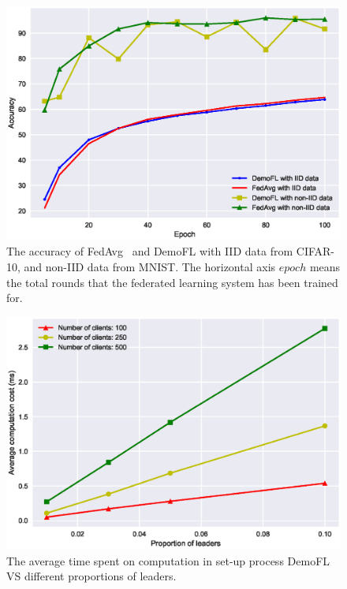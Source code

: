 \begin{figure}[!ht]
    \centering
    \includegraphics[width=\columnwidth]{img/acc.eps}
    \caption{The accuracy of FedAvg~\cite{mcmahan2016communicationefficient} and DemoFL with IID data from CIFAR-10, and non-IID data from MNIST. The horizontal axis $epoch$ means the total rounds that the federated learning system has been trained for. }
    \label{acc}
\end{figure}

\begin{figure}[!ht]
    \centering
    \includegraphics[width=\columnwidth]{img/leader-time.eps}
    \caption{The average time spent on computation in set-up process DemoFL VS different proportions of leaders.}
    \label{leader-time}
\end{figure}

